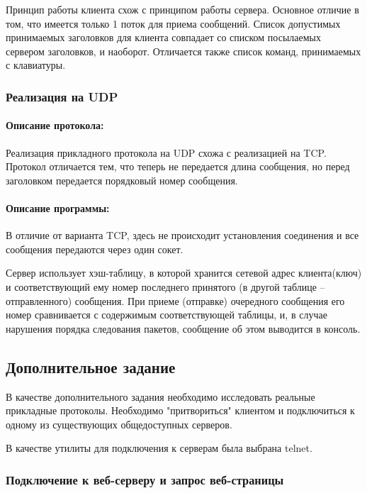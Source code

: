 Принцип работы клиента схож с принципом работы сервера. Основное отличие в том, что имеется только 1 поток для приема сообщений. Список допустимых принимаемых заголовков для клиента совпадает со списком посылаемых сервером заголовков, и наоборот. Отличается также список команд, принимаемых с клавиатуры.

\subsubsection{Реализация на UDP}

\paragraph{Описание протокола:}

Реализация прикладного протокола на UDP схожа с реализацией на TCP. Протокол отличается тем, что теперь не передается длина сообщения, но перед заголовком передается порядковый номер сообщения.

\paragraph{Описание программы:}

В отличие от варианта TCP, здесь не происходит установления соединения и все сообщения передаются через один сокет.

Сервер использует хэш-таблицу, в которой хранится сетевой адрес клиента(ключ) и соответствующий ему номер последнего принятого (в другой таблице -- отправленного) сообщения. При приеме (отправке) очередного сообщения его номер сравнивается с содержимым соответствующей таблицы, и, в случае нарушения порядка следования пакетов, сообщение об этом выводится в консоль.

\subsection{Дополнительное задание}

В качестве дополнительного задания необходимо исследовать реальные прикладные протоколы. Необходимо "притвориться" клиентом и подключиться к одному из существующих общедоступных серверов.

В качестве утилиты для подключения к серверам была выбрана telnet.

\subsubsection{Подключение к веб-серверу и запрос веб-страницы}

